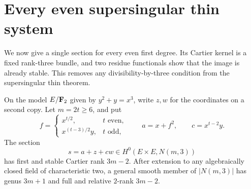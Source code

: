 \section{Every even supersingular thin system}\label{sec:ss-all-even}

We now give a single section for every even first degree. Its Cartier kernel is a fixed rank-three bundle, and two residue functionals show that the image is already stable. This removes any divisibility-by-three condition from the supersingular thin theorem.

\begin{proposition}\label{prop:ss-all-even}
On the model $E/\mathbf F_2$ given by $y^2+y=x^3$, write $z,w$ for the coordinates on a second copy. Let $m=2t\ge6$, and put
\[
 f=\begin{cases}
 x^{t/2},&t\text{ even},\\
 x^{(t-3)/2}y,&t\text{ odd},
 \end{cases}
 \qquad
 a=x+f^2,\qquad c=x^{t-2}y.
\]
The section
\[
                         s=a+z+cw\in H^0(E\times E,N(m,3))
\]
has first and stable Cartier rank $3m-2$. After extension to any algebraically closed field of characteristic two, a general smooth member of $|N(m,3)|$ has genus $3m+1$ and full and relative $2$-rank $3m-2$.
\end{proposition}
